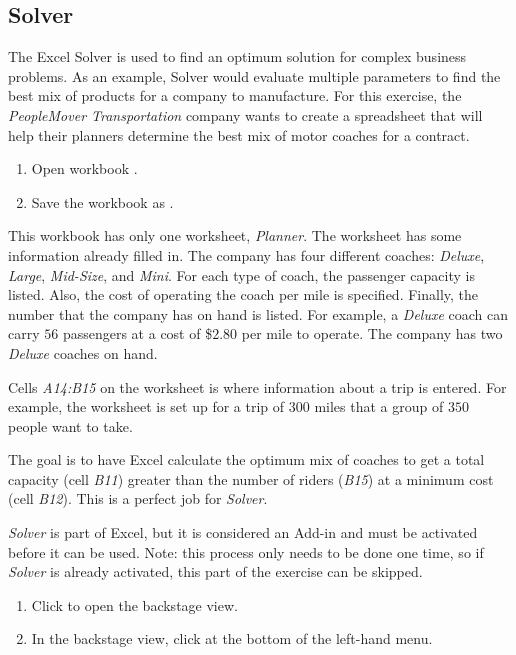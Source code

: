\subsection{Solver}

The Excel Solver is used to find an optimum solution for complex business problems. As an example, Solver would evaluate multiple parameters to find the best mix of products for a company to manufacture. For this exercise, the \textit{PeopleMover Transportation} company wants to create a spreadsheet that will help their planners determine the best mix of motor coaches for a contract.

\begin{enumerate}
	\item Open workbook .
	\item Save the workbook as .
\end{enumerate}

This workbook has only one worksheet, \textit{Planner}. The worksheet has some information already filled in. The company has four different coaches: \textit{Deluxe}, \textit{Large}, \textit{Mid-Size}, and \textit{Mini}. For each type of coach, the passenger capacity is listed. Also, the cost of operating the coach per mile is specified. Finally, the number that the company has on hand is listed. For example, a \textit{Deluxe} coach can carry $ 56 $ passengers at a cost of \$$ 2.80 $ per mile to operate. The company has two \textit{Deluxe} coaches on hand.

Cells \textit{A14:B15} on the worksheet is where information about a trip is entered. For example, the worksheet is set up for a trip of $ 300 $ miles that a group of $ 350 $ people want to take.

The goal is to have Excel calculate the optimum mix of coaches to get a total capacity (cell \textit{B11}) greater than the number of riders (\textit{B15}) at a minimum cost (cell \textit{B12}). This is a perfect job for \textit{Solver}.

\textit{Solver} is part of Excel, but it is considered an Add-in and must be activated before it can be used. Note: this process only needs to be done one time, so if \textit{Solver} is already activated, this part of the exercise can be skipped.

\begin{enumerate}[resume]
	\item Click  to open the backstage view.
	\item In the backstage view, click  at the bottom of the left-hand menu.
	
\end{enumerate}

